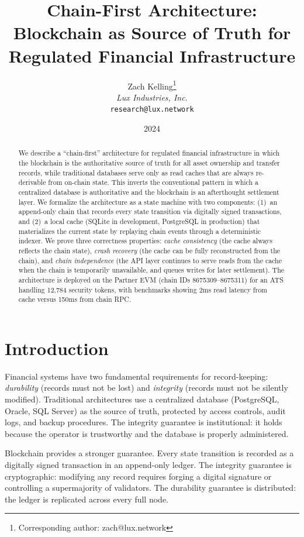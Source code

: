 \documentclass[11pt,a4paper]{article}
\title{Chain-First Architecture:\\Blockchain as Source of Truth for\\Regulated Financial Infrastructure}
\author{
Zach Kelling\thanks{Corresponding author: zach@lux.network}\\
\textit{Lux Industries, Inc.}\\
\texttt{research@lux.network}
}
\date{2024}
\begin{document}
\luxcoverpage

\begin{abstract}
We describe a ``chain-first'' architecture for regulated financial
infrastructure in which the blockchain is the authoritative source of
truth for all asset ownership and transfer records, while traditional
databases serve only as read caches that are always re-derivable from
on-chain state.  This inverts the conventional pattern in which a
centralized database is authoritative and the blockchain is an
afterthought settlement layer.  We formalize the architecture as a
state machine with two components: (1)~an append-only chain that
records every state transition via digitally signed transactions, and
(2)~a local cache (SQLite in development, PostgreSQL in production)
that materializes the current state by replaying chain events through
a deterministic indexer.  We prove three correctness properties:
\emph{cache consistency} (the cache always reflects the chain state),
\emph{crash recovery} (the cache can be fully reconstructed from the
chain), and \emph{chain independence} (the API layer continues to
serve reads from the cache when the chain is temporarily unavailable,
and queues writes for later settlement).  The architecture is deployed
on the Partner EVM (chain IDs 8675309--8675311) for an ATS handling
12,784 security tokens, with benchmarks showing 2ms read latency from
cache versus 150ms from chain RPC.
\end{abstract}

\tableofcontents
\newpage

\section{Introduction}
\label{sec:intro}

Financial systems have two fundamental requirements for record-keeping:
\emph{durability} (records must not be lost) and \emph{integrity}
(records must not be silently modified).  Traditional architectures
use a centralized database (PostgreSQL, Oracle, SQL Server) as the
source of truth, protected by access controls, audit logs, and backup
procedures.  The integrity guarantee is institutional: it holds because
the operator is trustworthy and the database is properly administered.

Blockchain provides a stronger guarantee.  Every state transition is
recorded as a digitally signed transaction in an append-only ledger.
The integrity guarantee is cryptographic: modifying any record requires
forging a digital signature or controlling a supermajority of
validators.  The durability guarantee is distributed: the ledger is
replicated across every full node.
\end{document}
